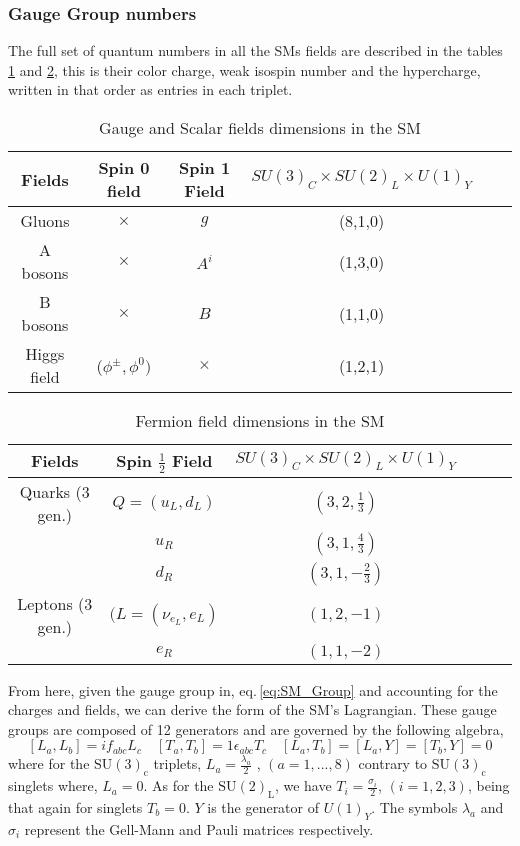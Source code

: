 \subsubsection{Gauge Group numbers}

The full set of quantum numbers in all the SMs fields are described in the tables \ref{table1} and \ref{table2}, this is their color charge, weak isospin number and the hypercharge, written in that order as entries in each triplet.
%
\begin{table}[H]
\centering
\caption{Gauge and Scalar fields dimensions in the SM}
\label{table1}
\begin{tabular}{@{}cccccc@{}}
  \hline	
 Fields & Spin 0 field & Spin 1 Field & $SU(3)_C \times SU(2)_L \times U(1)_Y$  \\
  \hline	
 Gluons  & $\times$  & $g$ & (8,1,0) \\	
A bosons & $\times$  & $A^i$ & (1,3,0)   \\
B bosons & $\times$  & $B$ & (1,1,0)   \\
Higgs field & ($\phi^\pm, \phi^0 )$  & $\times$ & (1,2,1) \\ \hline
\end{tabular}
\end{table}
%
\begin{table}[H]
\centering
\caption{Fermion field dimensions in the SM}
\label{table2}
\begin{tabular}{@{}cccccc@{}}
  \hline	
 Fields & Spin $\frac{1}{2}$ Field & $SU(3)_C \times SU(2)_L \times U(1)_Y$  \\
  \hline	
Quarks (3 gen.) & $Q=(u_L,d_L)$ & $(3,2,\frac{1}{3})$ \\	
$\quad$        & $u_R$ & $(3,1,\frac{4}{3})$   \\
$\quad$   & $d_R$ & $(3,1, -\frac{2}{3})$   \\
Leptons (3 gen.) & $(L=(\nu_{e_L}, e_L )$ & $(1,2,-1)$  \\
$\quad$   & $e_R$ & $(1,1,-2)   $ \\ \hline
%
\end{tabular}
\end{table}
%
From here, given the gauge group in, eq.\,\ref{eq:SM_Group} and accounting for the charges and fields, we can derive the form of the SM's Lagrangian. These gauge groups are composed of 12 generators and are governed by the following algebra, 
% 
\begin{equation}
\left[ L_a , L_b \right] = i f_{abc} L_c \quad \left[ T_a , T_b \right] = 1 \epsilon_{abc} T_c \quad \left[ L_a , T_b \right] = \left[ L_a , Y \right] = \left[ T_b,Y \right] = 0 
\end{equation}
%
where for the $\mathrm{SU(3)_c}$ triplets, $L_a= \frac{\lambda_a}{2}$ , $(a = 1, . . . , 8)$ {\color{gray} contrary to $\mathrm{SU(3)_c}$ singlets where, $L_a = 0$}.  As for the $\mathrm{SU(2)_L}$, we have $T_i= \frac{\sigma_i}{2} $, $(i = 1, 2, 3)$, {\color{gray} being that again for singlets $T_b=0$}. $Y$ is the generator of $U(1)_Y$. The symbols $\lambda_a$ and $\sigma_i$ represent the Gell-Mann and Pauli matrices respectively. 

